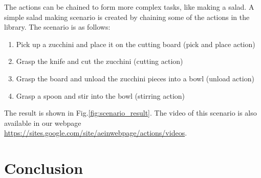 The actions can be chained to form more complex tasks, like making a salad.
A simple salad making scenario is created by chaining some of the actions in the library.
The scenario is as follows:
\begin{enumerate}
 \item Pick up a zucchini and place it on the cutting board (pick and place action)
 \item Grasp the knife and cut the zucchini (cutting action)
 \item Grasp the board and unload the zucchini pieces into a bowl (unload action)
 \item Grasp a spoon and stir into the bowl (stirring action)
\end{enumerate}

The result is shown in Fig.\ref{fig:scenario_result}.
The video of this scenario is also available in our webpage \url{https://sites.google.com/site/aeinwebpage/actions/videos}.

\section{Conclusion}
\label{sec:conclusion}





